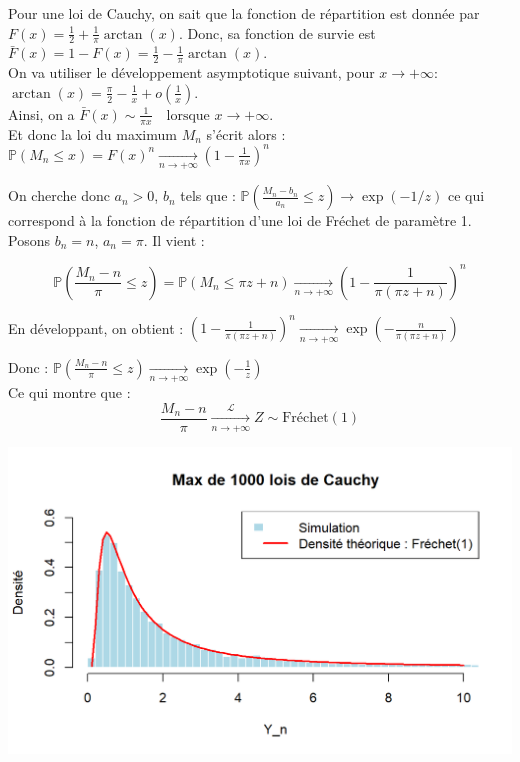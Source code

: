 \documentclass{article}
\theoremstyle{plain}
\theoremstyle{definition}
\theoremstyle{plain}
\begin{document}
\noindent Pour une loi de Cauchy, on sait que la fonction de répartition est donnée par $ F(x) = \frac{1}{2} + \frac{1}{\pi} \arctan(x) $. Donc, sa fonction de survie est $ \bar{F}(x) = 1 - F(x) = \frac{1}{2} - \frac{1}{\pi} \arctan(x) $. \\

\noindent On va utiliser le développement asymptotique suivant, pour \( x \to +\infty \): $\arctan(x) = \frac{\pi}{2} - \frac{1}{x} + o\left(\frac{1}{x}\right) $. \\

\noindent Ainsi, on a $\bar{F}(x) \sim \frac{1}{\pi x} \quad \text{lorsque } x \to +\infty$. \\
\noindent Et donc la loi du maximum \( M_n \) s’écrit alors : $ \mathbb{P}(M_n \leq x) = F(x)^n \xrightarrow[n \to +\infty]{} \left(1 - \frac{1}{\pi x}\right)^n $


\noindent On cherche donc \( a_n > 0 \), \( b_n \) tels que : $ \mathbb{P}\left( \frac{M_n - b_n}{a_n} \leq z \right) \to \exp(-1/z) $ ce qui correspond à la fonction de répartition d'une loi de Fréchet de paramètre 1. \\

\noindent Posons \( b_n = n \), \( a_n = \pi \). Il vient :

\[
\mathbb{P}\left( \frac{M_n - n}{\pi} \leq z \right) = \mathbb{P}\left( M_n \leq \pi z + n \right) \xrightarrow[n \to +\infty]{} \left(1 - \frac{1}{\pi(\pi z + n)}\right)^n
\]

\noindent En développant, on obtient : $\left(1 - \frac{1}{\pi(\pi z + n)}\right)^n \xrightarrow[n \to +\infty]{} \exp\left(- \frac{n}{\pi(\pi z + n)} \right)$

\noindent Donc : $\mathbb{P}\left( \frac{M_n - n}{\pi} \leq z \right) \xrightarrow[n \to +\infty]{} \exp\left(-\frac{1}{z} \right)$ \\

\noindent Ce qui montre que :
\[
\frac{M_n - n}{\pi} \xrightarrow[n \to +\infty]{\mathcal{L}} Z \sim \text{Fréchet}(1)
\]


\begin{center}
	\includegraphics[scale=0.8]{./images/Max_Cauchy.png} 
\end{center}
\end{document}

